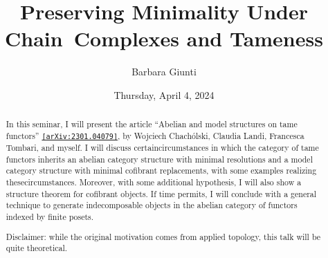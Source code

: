 \documentclass{UAmathtalk}
\author{Barbara Giunti}
\title{Preserving Minimality Under Chain~Complexes and Tameness}
\date{Thursday, April 4, 2024}
\begin{document}
\maketitle

\begin{abstract}
In this seminar, I will present the article “Abelian and model structures on tame functors” \href{http://www.arxiv.org/abs/2301.04079/}{\texttt{[arXiv:2301.04079]}}, by Wojciech \mbox{Chachólski}, Claudia Landi, Francesca Tombari, and myself. I will discuss certain\linebreak circumstances in which the category of tame functors inherits an abelian category structure with minimal resolutions and a model category structure with minimal cofibrant replacements, with some examples realizing these\linebreak circumstances. Moreover, with some additional hypothesis,  I will also show a structure theorem for cofibrant objects. If time permits, I will conclude with a general technique to generate indecomposable objects in the abelian category of functors indexed by finite posets.

Disclaimer: while the original motivation comes from applied topology, this talk will be quite theoretical.
\end{abstract}
\end{document}
